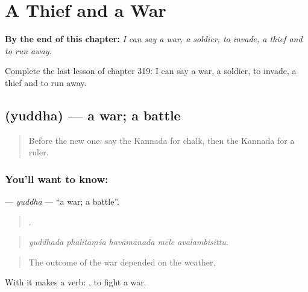 
\chapter{A Thief and a War}
\label{ch:ka-a-thief-and-a-war}

\begin{chapteropening}
\textbf{By the end of this chapter:} \emph{I can say a war, a soldier, to invade, a thief and to run away.}

Complete the last lesson of chapter 319: I can say a war, a soldier, to invade, a thief and to run away.
\end{chapteropening}

\section[\texorpdfstring{\kn{ಯುದ್ಧ} (yuddha)}{ಯುದ್ಧ (yuddha)}]{ (yuddha) — a war; a battle}

\label{lesson:KA-C319-yuddha}



\begin{quote}
Before the new one: say the Kannada for chalk, then the Kannada for a ruler.
\end{quote}

\subsection*{You'll want to know: }
\textbf{} — \emph{yuddha} — \textquotedblleft{}a war; a battle\textquotedblright{}.

\begin{quote}
    .
\end{quote}

\begin{quote}
\emph{yuddhada phalitāṃśa havāmānada mēle avalambisittu.}
\end{quote}

\begin{quote}
The outcome of the war depended on the weather.
\end{quote}

With  it makes a verb:  , to fight a war.

